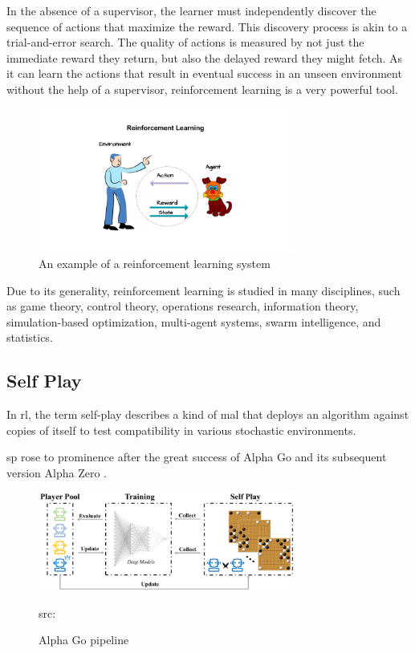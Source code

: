 In the absence of a supervisor, the learner must independently discover the sequence of actions that maximize the reward. This discovery process is akin to a trial-and-error search. The quality of actions is measured by not just the immediate reward they return, but also the delayed reward they might fetch. As it can learn the actions that result in eventual success in an unseen environment without the help of a supervisor, reinforcement learning is a very powerful tool.
\begin{figure}[H]
	\centering
	\includegraphics[width=0.75\textwidth]{Figures/RLCartoon.png}
	\caption{An example of a reinforcement learning system}
\end{figure}
\FloatBarrier


Due to its generality, reinforcement learning is studied in many disciplines, such as game theory, control theory, operations research, information theory, simulation-based optimization, multi-agent systems, swarm intelligence, and statistics. 
\subsection{Self Play}
In \acrfull{rl}, the term self-play describes a kind of \acrfull{mal} that
deploys an algorithm against copies of itself to test compatibility in various stochastic environments.

\acrfull{sp} rose to prominence after the great success of Alpha Go \cite{AlphaGo} and its subsequent version Alpha Zero \cite{AlphaZero}.

\begin{figure}[H]
	\centering
	\includegraphics[width=0.75\textwidth]{Figures/AlphaZeroSelfPlay.png}
	\caption{Alpha Go pipeline}
	\scriptsize src: 
\end{figure}
\FloatBarrier

